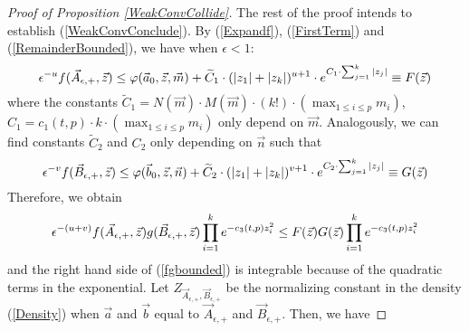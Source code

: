 \begin{proof}[Proof of Proposition \ref{WeakConvCollide}]
The rest of the proof intends to establish (\ref{WeakConvConclude}). By (\ref{Expandf}), (\ref{FirstTerm}) and (\ref{RemainderBounded}), we have when $\epsilon<1$:
\begin{equation}{\label{fbounded}}
\epsilon^{-u}f(\vec{A}_{\epsilon,+},\vec{z})\leq\varphi(\vec{a}_0,\vec{z},\vec{m})+\widetilde{C}_1\cdot(|z_1|+|z_k|)^{u+1}\cdot e^{C_{1}\cdot\sum_{j=1}^{k}|z_{j}|}\equiv F(\vec{z})
\end{equation}
where the constants $\widetilde{C}_{1}=N(\vec{m})\cdot M(\vec{m})\cdot(k!)\cdot\left(\max_{1\leq i\leq p}m_i\right)$, $C_1=c_1(t,p)\cdot k\cdot (\max_{1\leq i\leq p} m_i)$ only depend on $\vec{m}$. Analogously, we can find constants $\widetilde{C}_2$ and $C_2$ only depending on $\vec{n}$ such that 
\begin{equation}{\label{gbounded}}
\epsilon^{-v}f(\vec{B}_{\epsilon,+},\vec{z})\leq\varphi(\vec{b}_0,\vec{z},\vec{n})+\widetilde{C}_2\cdot(|z_1|+|z_k|)^{v+1}\cdot e^{C_{2}\cdot\sum_{j=1}^{k}|z_{j}|}\equiv G(\vec{z})
\end{equation}
Therefore, we obtain 
\begin{equation}{\label{fgbounded}}
	\epsilon^{-(u+v)}f(\vec{A}_{\epsilon,+},\vec{z})g(\vec{B}_{\epsilon,+},\vec{z})\prod_{i=1}^{k}e^{-c_{3}(t,p)z^{2}_{i}}\leq F(\vec{z})G(\vec{z})\prod_{i=1}^{k}e^{-c_3(t,p)z^2_i}
\end{equation}
and the right hand side of (\ref{fgbounded}) is integrable because of the quadratic terms in the exponential. Let $Z_{\vec{A}_{\epsilon,+},\vec{B}_{\epsilon,+}}$ be the normalizing constant in the density (\ref{Density}) when $\vec{a}$ and $\vec{b}$ equal to $\vec{A}_{\epsilon,+}$ and $\vec{B}_{\epsilon,+}$. Then, we have


\end{proof}
